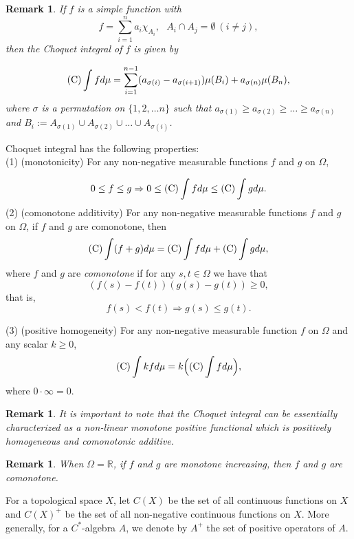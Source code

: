 \documentclass[a4paper,12pt]{amsart}
\newtheorem{remark}[definition]{Remark}
\begin{document}
\begin{remark} \rm  If $f$ is a simple function with 
$$
f = \sum_{i=1}^{n} a_i \chi _{A_i},  \ \ \  A_i \cap A_j = \emptyset  \  ( i\not=j),  
$$
then the Choquet integral of $f$ is given by 

$$
{\rm (C)}\int f d\mu = \sum_{i=1}^{n-1} (a_{\sigma(i) }- a_{\sigma(i+1)})\mu(B_i) 
+ a_{\sigma(n) }\mu(B_n) , 
$$
where $\sigma$ is a permutation on $\{1,2,\dots n\}$ such that 
$a_{\sigma(1)} \geq a_{\sigma(2)} \geq  \dots \geq a_{\sigma(n)}$ 
and
$B_i := A_{\sigma(1)} \cup A_{\sigma(2)} \cup \dots \cup A_{\sigma(i)}$. 
\end{remark}

Choquet integral has the following properties: \\
 (1) (monotonicity)  
For any  non-negative measurable functions $f$ and $g$  on $\Omega$, 

$$
0 \leq f \leq g \Rightarrow 0 \leq {\rm (C)} \int f d \mu \leq   {\rm (C)}\int g d \mu .
$$ 
\noindent
(2) (comonotone additivity) 
For any  non-negative measurable functions $f$ and $g$  on $\Omega$, 
if $f$ and $g$ are comonotone, then 
$$
{\rm (C)} \int (f + g)  d \mu
= {\rm (C)} \int f d \mu + {\rm (C)}\int g d \mu ,
$$  
where $f$ and $g$ are {\it comonotone} if 
for any $s,t \in \Omega$ we have  that 
$$
(f(s) -f(t))(g(s)-g(t)) \geq 0, 
$$
that is, 
$$
f(s) < f(t)   \Rightarrow   g(s)  \leq g(t) . 
$$ 

\noindent
(3) (positive homogeneity)
For any  non-negative measurable function $f$ on $\Omega$ and 
any scalar $k \geq 0$, 
$$
 {\rm (C)} \int kf d \mu = k  \Bigl( {\rm (C)} \int f d \mu \Bigr) , 
 $$
where $0 \cdot \infty = 0$. 


\begin{remark} \rm 
It is important to note that the Choquet integral can be {\it essentially} characterized as a non-linear monotone positive functional 
which is positively homogeneous and comonotonic additive.  
\end{remark}

\begin{remark} \rm
When $\Omega = {\mathbb R}$, if $f$ and $g$ are monotone increasing, then  $f$ and $g$ are comonotone. 
\end{remark}

For a topological space $X$, let $C(X)$ be the set of all continuous functions on $X$ and 
$C(X)^+$ be the set of all non-negative continuous functions on $X$. More generally, for a $C^*$-algebra $A$, we denote by $A^+$ the set of positive operators of $A$.  
\end{document}

